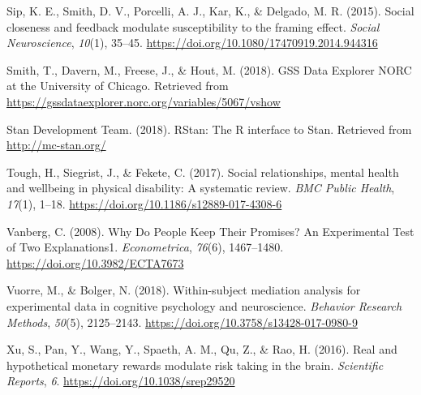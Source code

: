 \documentclass[12pt,]{article}
\begin{document}
\leavevmode\hypertarget{ref-Sip2015}{}%
Sip, K. E., Smith, D. V., Porcelli, A. J., Kar, K., \& Delgado, M. R.
(2015). Social closeness and feedback modulate susceptibility to the
framing effect. \emph{Social Neuroscience}, \emph{10}(1), 35--45.
\url{https://doi.org/10.1080/17470919.2014.944316}

\leavevmode\hypertarget{ref-GSS2018}{}%
Smith, T., Davern, M., Freese, J., \& Hout, M. (2018). GSS Data Explorer
\textbar{} NORC at the University of Chicago. Retrieved from
\url{https://gssdataexplorer.norc.org/variables/5067/vshow}

\leavevmode\hypertarget{ref-Rstan2018}{}%
Stan Development Team. (2018). RStan: The R interface to Stan. Retrieved
from \url{http://mc-stan.org/}

\leavevmode\hypertarget{ref-Tough2017}{}%
Tough, H., Siegrist, J., \& Fekete, C. (2017). Social relationships,
mental health and wellbeing in physical disability: A systematic review.
\emph{BMC Public Health}, \emph{17}(1), 1--18.
\url{https://doi.org/10.1186/s12889-017-4308-6}

\leavevmode\hypertarget{ref-Vanberg2008}{}%
Vanberg, C. (2008). Why Do People Keep Their Promises? An Experimental
Test of Two Explanations1. \emph{Econometrica}, \emph{76}(6),
1467--1480. \url{https://doi.org/10.3982/ECTA7673}

\leavevmode\hypertarget{ref-Vuorre2018}{}%
Vuorre, M., \& Bolger, N. (2018). Within-subject mediation analysis for
experimental data in cognitive psychology and neuroscience.
\emph{Behavior Research Methods}, \emph{50}(5), 2125--2143.
\url{https://doi.org/10.3758/s13428-017-0980-9}

\leavevmode\hypertarget{ref-Xu2016}{}%
Xu, S., Pan, Y., Wang, Y., Spaeth, A. M., Qu, Z., \& Rao, H. (2016).
Real and hypothetical monetary rewards modulate risk taking in the
brain. \emph{Scientific Reports}, \emph{6}.
\url{https://doi.org/10.1038/srep29520}
\end{document}
